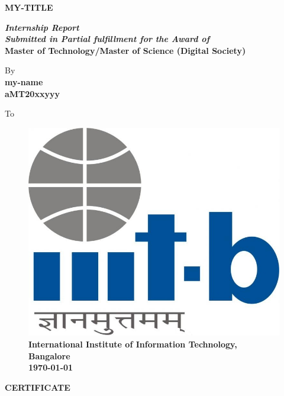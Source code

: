 \documentclass[english,a4paper,11pt]{report}
\newcommand{\reporttitle}{my-title}
\newcommand{\studentname}{my-name}
\newcommand{\rollnumber}{aMT20xxyyy}
\begin{document}
	\thispagestyle{empty}
	\begin{center}
		\vspace*{1mm}
		\Large{\MakeUppercase{\textbf{\reporttitle}}}\\
		\large
		
		\vspace{4cm}
		\textit{\textbf{Internship Report}}\\
		\textit{\textbf{Submitted in Partial fulfillment for the Award of}}\\
		\textbf{Master of Technology/Master of Science (Digital Society)}
		\vspace*{1.5cm}
		
		By\\
		
		\vspace*{1.4cm}
		{\bf \studentname}\\
		\textbf{\rollnumber}\\
		
		\vspace{3.6cm}
		
		To\\	
		\vspace{2.4cm}
		\begin{figure}[h]
			\centering
			\large
			\includegraphics[width=0.15\columnwidth]{images/iiitb_logo.png}\\
			\textbf{International Institute of Information Technology, Bangalore}\\
			\textbf{\monthyear\today}
		\end{figure}
	\end{center}
	\clearpage
	
	\newpage
	
	\thispagestyle{empty}
	\begin{center}
		\Large
		\vspace*{0.5cm}
		\textbf{\MakeUppercase{Certificate}}
		\vspace{1cm}
	\end{center}
	
\end{document}
